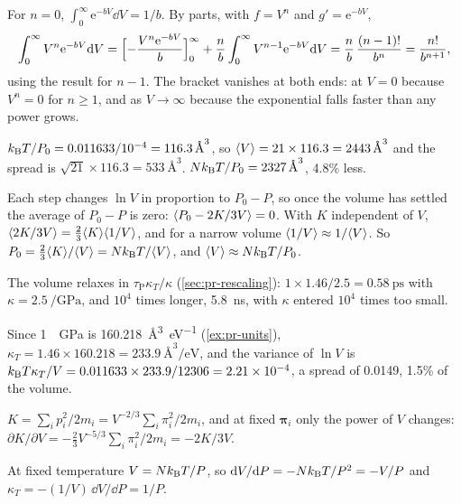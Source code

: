For $n = 0$, $\int_0^\infty\mathrm{e}^{-bV}\dd V =
1/b$. By parts, with $f = V^n$ and $g' = \mathrm{e}^{-bV}$,
\begin{equation*}
   \int_0^\infty V^n\mathrm{e}^{-bV}\mathrm{d} V
   = \Bigl[-\frac{V^n\mathrm{e}^{-bV}}{b}\Bigr]_0^\infty
   + \frac nb\int_0^\infty V^{n-1}\mathrm{e}^{-bV}\mathrm{d} V
   = \frac nb\,\frac{(n - 1)!}{b^n} = \frac{n!}{b^{n+1}} ,
\end{equation*}
using the result for $n - 1$. The bracket vanishes at both ends: at $V =
0$ because $V^n = 0$ for $n \geq 1$, and as $V \to \infty$ because the
exponential falls faster than any power grows.

$k_{\mathrm{B}} T/P_0 = 0.011633/10^{-4} =
\SI{116.3}{\angstrom\cubed}$, so $\langle V \rangle = 21\times116.3 =
\SI{2443}{\angstrom\cubed}$ and the spread is $\sqrt{21}\times116.3 =
\SI{533}{\angstrom\cubed}$. $Nk_{\mathrm{B}} T/P_0 = \SI{2327}{\angstrom\cubed}$, 4.8\%
less.

Each step changes $\ln V$ in proportion
to $P_0 - P$, so once the volume has settled the average of $P_0 - P$ is
zero: $\langle P_0 - 2K/3V \rangle = 0$. With
$K$ independent of $V$, $\langle 2K/3V \rangle = \frac23\langle K \rangle\langle 1/V \rangle$, and for a
narrow volume $\langle 1/V \rangle \approx 1/\langle V \rangle$. So $P_0 = \frac23\langle K \rangle/
\langle V \rangle = Nk_{\mathrm{B}} T/\langle V \rangle$, and $\langle V \rangle \approx Nk_{\mathrm{B}} T/P_0$.

The volume relaxes in $\tau_{\mathrm P}\kappa_T/
\kappa$ (\cref{sec:pr-rescaling}): $1\times1.46/2.5 =
\SI{0.58}{\pico\second}$ with $\kappa = \SI{2.5}{\per\giga\pascal}$, and $10^4$ times longer,
\SI{5.8}{\nano\second}, with $\kappa$ entered $10^4$ times too small.

Since \SI{1}{\per\giga\pascal} is
\SI{160.218}{\angstrom\cubed\per\electronvolt} (\cref{ex:pr-units}),
$\kappa_T = 1.46\times160.218 = \SI{233.9}{\angstrom\cubed\per
\electronvolt}$, and the variance of $\ln V$ is $k_{\mathrm{B}} T\kappa_T/V =
0.011633\times233.9/12306 = 2.21\times10^{-4}$, a spread of 0.0149, 1.5\% of the volume.

$K = \sum_ip_i^2/2m_i = V^{-2/3}\sum_i\pi_i^2/
2m_i$, and at fixed $\boldsymbol{\pi}_i$ only the power of $V$ changes:
$\partial K/\partial V = -\frac23V^{-5/3}\sum_i\pi_i^2/2m_i = -2K/3V$.

At fixed temperature $V = Nk_{\mathrm{B}} T/P$, so
$\mathrm{d} V/\mathrm{d} P = -Nk_{\mathrm{B}} T/P^2 = -V/P$ and $\kappa_T = -(1/V)\,\dd V/\dd P =
1/P$.

